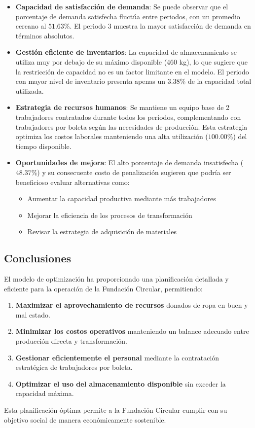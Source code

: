 \begin{itemize}
    \item \textbf{Capacidad de satisfacción de demanda}: Se puede observar que el porcentaje de demanda satisfecha fluctúa entre periodos, con un promedio cercano al $51.63$\%. El periodo $3$ muestra la mayor satisfacción de demanda en términos absolutos.

    \item \textbf{Gestión eficiente de inventarios}: La capacidad de almacenamiento se utiliza muy por debajo de su máximo disponible (460 kg), lo que sugiere que la restricción de capacidad no es un factor limitante en el modelo. El periodo con mayor nivel de inventario presenta apenas un $3.38$\% de la capacidad total utilizada.

    \item \textbf{Estrategia de recursos humanos}: Se mantiene un equipo base de 2 trabajadores contratados durante todos los periodos, complementando con trabajadores por boleta según las necesidades de producción. Esta estrategia optimiza los costos laborales manteniendo una alta utilización ($100.00$\%) del tiempo disponible.

    \item \textbf{Oportunidades de mejora}: El alto porcentaje de demanda insatisfecha ($48.37$\%) y su consecuente costo de penalización sugieren que podría ser beneficioso evaluar alternativas como:
    \begin{itemize}
        \item Aumentar la capacidad productiva mediante más trabajadores
        \item Mejorar la eficiencia de los procesos de transformación
        \item Revisar la estrategia de adquisición de materiales
    \end{itemize}
\end{itemize}

\subsection*{Conclusiones}

El modelo de optimización ha proporcionado una planificación detallada y eficiente para la operación de la Fundación Circular, permitiendo:

\begin{enumerate}
    \item \textbf{Maximizar el aprovechamiento de recursos} donados de ropa en buen y mal estado.
    \item \textbf{Minimizar los costos operativos} manteniendo un balance adecuado entre producción directa y transformación.
    \item \textbf{Gestionar eficientemente el personal} mediante la contratación estratégica de trabajadores por boleta.
    \item \textbf{Optimizar el uso del almacenamiento disponible} sin exceder la capacidad máxima.
\end{enumerate}

Esta planificación óptima permite a la Fundación Circular cumplir con su objetivo social de manera económicamente sostenible.
